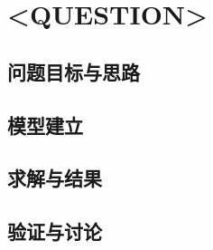 \section{<QUESTION>}

\subsection{问题目标与思路}

\subsection{模型建立}

\subsection{求解与结果}

\subsection{验证与讨论}
